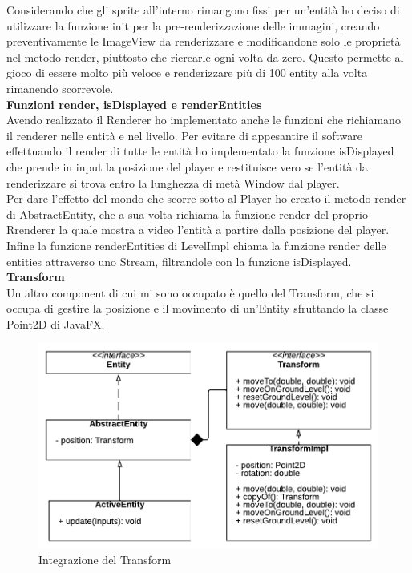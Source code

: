 \documentclass{article}
\begin{document}
Considerando che gli sprite all'interno rimangono fissi per un'entità ho deciso di utilizzare la funzione init per la pre-renderizzazione delle immagini, creando preventivamente le ImageView da renderizzare e modificandone solo le proprietà nel metodo render, piuttosto che ricrearle ogni volta da zero. Questo permette al gioco di essere molto più veloce e renderizzare più di 100 entity alla volta rimanendo scorrevole.\\

\textbf{Funzioni render, isDisplayed e renderEntities}\\
Avendo realizzato il Renderer ho implementato anche le funzioni che richiamano il renderer nelle entità e nel livello.
Per evitare di appesantire il software effettuando il render di tutte le entità ho implementato la funzione isDisplayed che prende in input la posizione del player e restituisce vero se l'entità da renderizzare si trova entro la lunghezza di metà Window dal player.\\

Per dare l'effetto del mondo che scorre sotto al Player ho creato il metodo render di AbstractEntity, che a sua volta richiama la funzione render del proprio Rrenderer la quale mostra a video l'entità a partire dalla posizione del player.\\

Infine la funzione renderEntities di LevelImpl chiama la funzione render delle entities attraverso uno Stream, filtrandole con la funzione isDisplayed.\\

\textbf{Transform}\\
Un altro component di cui mi sono occupato è quello del Transform, che si occupa di gestire la posizione e il movimento di un'Entity sfruttando la classe Point2D di JavaFX.

\begin{figure}[ht]
    \includegraphics[width=1\textwidth]{images/Transform.png}
    \caption{Integrazione del Transform}
    \label{fig:transform}
\end{figure}
\end{document}
